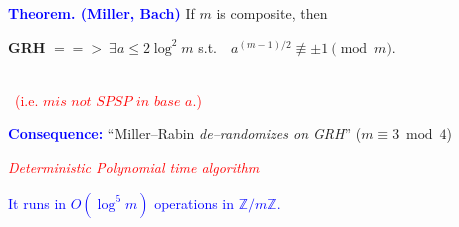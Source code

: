 \documentclass[landscape,handout]{powersem} %
\newcommand{\heading}[1]{%
 \begin{center}
  \large\bf
  \shadowbox{{\textcolor{conceptcolor}{#1}}}%
 \end{center}
 \vspace{1ex minus 1ex}}
\begin{document}
\begin{slide}
\heading{Deterministic primality tests}\pause

\textbf{\textcolor{blue}{Theorem. (Miller, Bach)}} If $m$ is
composite, then \centerline{\textbf{{GRH}} $=\!\!\!=\!\!\!>\
\exists a\leq 2\log^2 m$ s.t.\ \ $a^{(m-1)/2}\not\equiv
\pm1\pmod{m}$.}\\ \ \hfill\textcolor{red}{(i.e. $m \textit{
is not SPSP in base } a.$)}\pause

\small{\textbf{\textcolor{blue}{Consequence:}} ``Miller--Rabin
\emph{de--randomizes on GRH}'' ($m\equiv3\bmod4$)}\pause

\pause

\emph{\textcolor{red}{Deterministic Polynomial time algorithm}}\pause

\textcolor{blue}{It runs in $O(\log^5m)$ operations in ${\mathbb
Z}/m\mathbb Z$.}


\end{slide}
\end{document}
